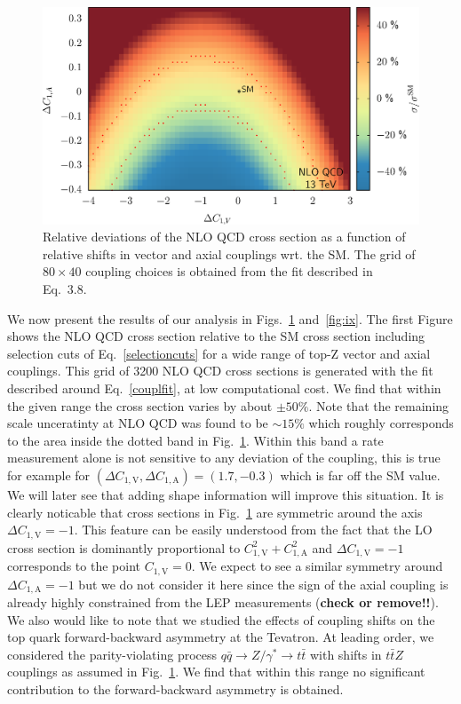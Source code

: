 \documentclass[preprint]{JHEP3} %
\def\ttbZ{t\bar{t}Z}
\def\ttb{t\bar{t}}
\def\ConeA{C_{1,\mathrm{A}}}
\def\ConeV{C_{1,\mathrm{V}}}
\begin{document}
\begin{figure}[t]
\centering
\includegraphics[scale=0.6]{LHC_53_SigmaNLO.eps}
\caption{ \label{fig:viii} Relative deviations of the NLO QCD cross section as a function of relative shifts in vector and axial couplings wrt. the SM.
The grid of $ 80 \times 40 $ coupling choices is obtained from the fit described in Eq.~3.8. }
\end{figure}

We now present the results of our analysis in Figs.~\ref{fig:viii} and~\ref{fig:ix}.
The first Figure shows the NLO QCD cross section relative to the SM cross section 
including selection cuts of Eq.~\ref{selectioncuts} for a wide range of top-Z vector and axial couplings.
This grid of 3200 NLO QCD cross sections is generated with the fit described around Eq.~\ref{couplfit}, at low computational cost.
We find that within the given range the cross section varies by about $\pm 50\%$.
Note that the remaining scale unceratinty at NLO QCD was found to be $\sim 15\%$ which roughly corresponds to the area inside the dotted band in Fig.~\ref{fig:viii}.
Within this band a rate measurement alone is not sensitive to any deviation of the coupling, this is true for example for $(\Delta\ConeV,\Delta\ConeA)=(1.7,-0.3)$ which is far off the SM value.
We will later see that adding shape information will improve this situation.
It is clearly noticable that cross sections in Fig.~\ref{fig:viii} are symmetric around the axis $\Delta\ConeV=-1$. This feature can be easily understood
from the fact that the LO cross section is dominantly proportional to $\ConeV^2+\ConeA^2$ and $\Delta\ConeV=-1$ corresponds to the point $\ConeV=0$.
We expect to see a similar symmetry around $\Delta\ConeA=-1$ but we do not consider it here since the sign of the axial coupling is already highly constrained from 
the LEP measurements ({\bf check or remove!!}).
We also would like to note that we studied the effects of coupling shifts on the top quark forward-backward asymmetry at the Tevatron.
At leading order, we considered the parity-violating process $q \bar{q} \to Z/\gamma^* \to \ttb$ with shifts in $\ttbZ$ couplings as assumed in Fig.~\ref{fig:viii}.
We find that within this range no significant contribution to the forward-backward asymmetry is obtained.
\end{document}
